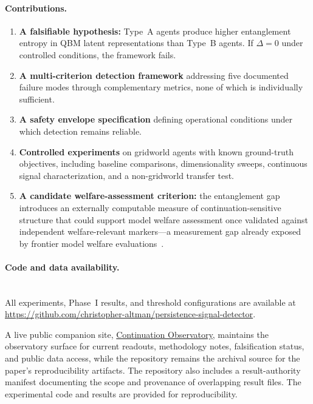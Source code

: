 \documentclass[11pt]{article}
\begin{document}
	\paragraph{Contributions.}
	\begin{enumerate}
		\item \textbf{A falsifiable hypothesis:} Type~A agents produce higher
		entanglement entropy in QBM latent representations than Type~B agents. If
		$\Delta = 0$ under controlled conditions, the framework fails.
		\item \textbf{A multi-criterion detection framework} addressing five
		documented failure modes through complementary metrics, none of which is
		individually sufficient.
		\item \textbf{A safety envelope specification} defining operational conditions
		under which detection remains reliable.
		\item \textbf{Controlled experiments} on gridworld agents with known
		ground-truth objectives, including baseline comparisons, dimensionality
		sweeps, continuous signal characterization, and a non-gridworld transfer
		test.
		\item \textbf{A candidate welfare-assessment criterion:} the
		entanglement gap introduces an externally computable measure of
		continuation-sensitive structure that could support model welfare
		assessment once validated against independent welfare-relevant
		markers---a measurement gap already exposed by frontier model welfare
		evaluations~\cite{anthropic2026opus}.
	\end{enumerate}
	
\paragraph{Code and data availability.}

\mbox{}\\[0.75\baselineskip]
All experiments, Phase~I results, and threshold configurations are available at \newline
\hspace*{6em}
 \footnotesize\url{https://github.com/christopher-altman/persistence-signal-detector}.
\normalsize
	
	A live public companion site, \href{https://www.continuationobservatory.org/}{Continuation Observatory}, maintains the observatory surface for current readouts, methodology notes, falsification status, and public data access, while the repository remains the archival source for the paper's reproducibility artifacts.
	The repository also includes a result-authority manifest documenting the
	scope and provenance of overlapping result files.
	The experimental code and results are provided for reproducibility.
	
\end{document}
